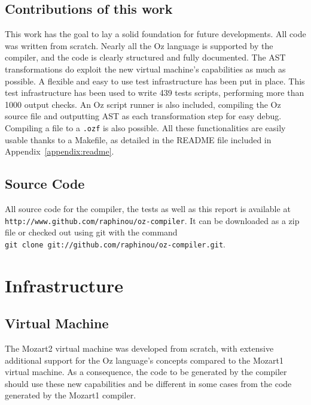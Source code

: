 \documentclass[a4paper]{memoir}
\begin{document}
\section{Contributions of this work}
This work has the goal to lay a solid foundation for future developments. All code was written from scratch.
Nearly all the Oz language is supported by the compiler, and the code is clearly structured and fully documented.
The AST transformations do exploit the new virtual machine's capabilities as much as possible.
A flexible and easy to use test infrastructure has been put in place. This test infrastructure has been used
to write 439 tests scripts, performing more than 1000 output checks.
An Oz script runner is also included, compiling the Oz source file and outputting AST as each transformation step for easy debug.
Compiling a file to a \lstinline!.ozf! is also possible.
All these functionalities are easily usable thanks to a Makefile, as detailed in the README file included in Appendix~\ref{appendix:readme}. 
\section{Source Code}
All source code for the compiler, the tests as well as this report is available
at \lstinline!http://www.github.com/raphinou/oz-compiler!. It can be downloaded
as a zip file or checked out using git with the command \\
\lstinline!git clone git://github.com/raphinou/oz-compiler.git!.
\chapter{Infrastructure}
\section{Virtual Machine}
The Mozart2 virtual machine was developed from scratch, with extensive additional support for the Oz language's concepts compared to the Mozart1 virtual machine. As a consequence, the code to be generated by the compiler should use these new capabilities and be different in some cases from the code generated by the Mozart1 compiler.
\end{document}
